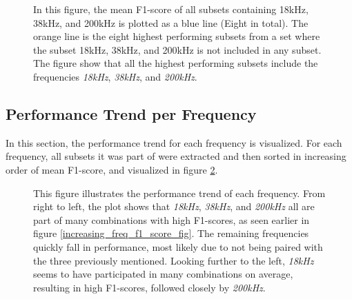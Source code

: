         \begin{figure}[H]
            \centering
            
            \caption[With and without unique subset]{In this figure, the mean F1-score of all subsets containing 18kHz, 38kHz, and 200kHz is plotted as a blue line (Eight in total). The orange line is the eight highest performing subsets from a set where the subset 18kHz, 38kHz, and 200kHz is not included in any subset. The figure show that all the highest performing subsets include the frequencies \textit{18kHz}, \textit{38kHz}, and \textit{200kHz}.}
          	\medskip 
            \label{with_without_figure}
        \end{figure}
        
        
    \subsection{Performance Trend per Frequency}
        In this section, the performance trend for each frequency is visualized. For each frequency, all subsets it was part of were extracted and then sorted in increasing order of mean F1-score, and visualized in figure \ref{performance_trend_fig}.
        
        \begin{figure}[H]
            \centering
            
            \caption[Performance trend per frequency]{This figure illustrates the performance trend of each frequency. From right to left, the plot shows that \textit{18kHz}, \textit{38kHz}, and \textit{200kHz} all are part of many combinations with high F1-scores, as seen earlier in figure \ref{increasing_freq_f1_score_fig}. The remaining frequencies quickly fall in performance, most likely due to not being paired with the three previously mentioned. Looking further to the left, \textit{18kHz} seems to have participated in many combinations on average, resulting in high F1-scores, followed closely by \textit{200kHz}.}
          	\medskip 
            \label{performance_trend_fig}
        \end{figure}
        


